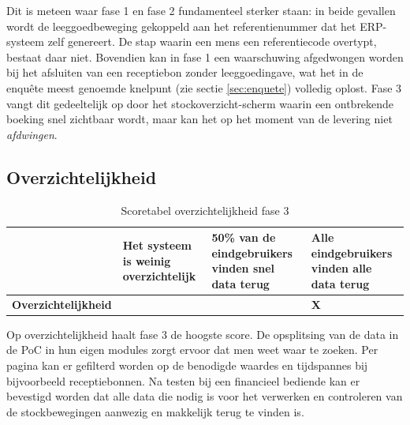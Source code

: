 Dit is meteen waar fase 1 en fase 2 fundamenteel sterker staan: in beide gevallen wordt de leeggoedbeweging gekoppeld aan het referentienummer dat het ERP-systeem zelf genereert. De stap waarin een mens een referentiecode overtypt, bestaat daar niet. Bovendien kan in fase 1 een waarschuwing afgedwongen worden bij het afsluiten van een receptiebon zonder leeggoedingave, wat het in de enquête meest genoemde knelpunt (zie sectie \ref{sec:enquete}) volledig oplost. Fase 3 vangt dit gedeeltelijk op door het stockoverzicht-scherm waarin een ontbrekende boeking snel zichtbaar wordt, maar kan het op het moment van de levering niet \emph{afdwingen}.

\subsection{Overzichtelijkheid}

\begin{table}[H]
    \centering
    \begin{tabular}{|p{4cm}|p{3cm}|p{3cm}|p{3cm}|}
        \hline
        & \textbf{Het systeem is weinig overzichtelijk} & \textbf{50\% van de eindgebruikers vinden snel data terug} & \textbf{Alle eindgebruikers vinden alle data terug} \\
        \hline
        \textbf{Overzichtelijkheid} &  &  & \textbf{X} \\
        \hline
    \end{tabular}
    \caption[Scoretabel overzichtelijkheid fase 3]{\label{tab:tbo_f3}Scoretabel overzichtelijkheid fase 3}
\end{table}

Op overzichtelijkheid haalt fase 3 de hoogste score. De opsplitsing van de data in de PoC in hun eigen modules zorgt ervoor dat men weet waar te zoeken. Per pagina kan er gefilterd worden op de benodigde waardes en tijdspannes bij bijvoorbeeld receptiebonnen. Na testen bij een financieel bediende kan er bevestigd worden dat alle data die nodig is voor het verwerken en controleren van de stockbewegingen aanwezig en makkelijk terug te vinden is.

